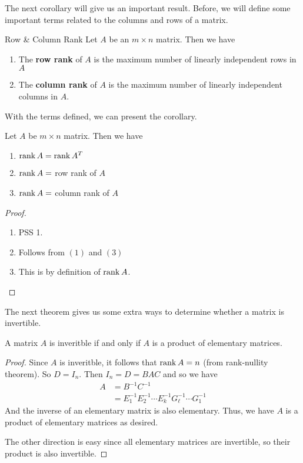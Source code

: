 \documentclass[main.tex]{subfiles}
\begin{document}
    The next corollary will give us an important result. Before, we will define some important terms related to the columns and rows of a matrix. 
    \begin{defn}{Row \& Column Rank}{}
        Let $A$ be an $m\times n$ matrix. Then we have 
        \begin{enumerate}
            \item The \textbf{row rank} of $A$ is the maximum number of linearly independent rows in $A$ 
            \item The \textbf{column rank} of $A$ is the maximum number of linearly independent columns in $A$.
        \end{enumerate}
    \end{defn}
    With the terms defined, we can present the corollary. 
    \begin{cor}{}{}
        Let $A$ be $m\times n$ matrix. Then we have 
        \begin{enumerate}
            \item $\operatorname{rank} A = \operatorname{rank} A^T$
            \item $\operatorname{rank} A = $ row rank of $A$
            \item $\operatorname{rank} A = $ column rank of $A$
        \end{enumerate}
    \end{cor}
    \begin{proof}
        \begin{enumerate}
            \item PSS 1. 
            \item Follows from $(1)$ and $(3)$
            \item This is by definition of $\operatorname{rank} A$.
        \end{enumerate}
    \end{proof}
    The next theorem gives us some extra ways to determine whether a matrix is invertible. 
    \begin{cor}{}{}
        A matrix $A$ is inveritble if and only if $A$ is a product of elementary matrices.
    \end{cor}
    \begin{proof}
        Since $A$ is inveritble, it follows that $\operatorname{rank} A = n$ (from rank-nullity theorem). So $D = I_n$. Then $I_n = D = BAC$ and so we have 
        \begin{align*}
            A &= B^{-1}C^{-1} \\
            &= E_1^{-1}E_2^{-1}\cdots E_k^{-1} G_\ell^{-1}\cdots G_1^{-1}
        \end{align*}
        And the inverse of an elementary matrix is also elementary. Thus, we have $A$ is a product of elementary matrices as desired. \par 

        The other direction is easy since all elementary matrices are invertible, so their product is also invertible. 
    \end{proof}
\end{document}
